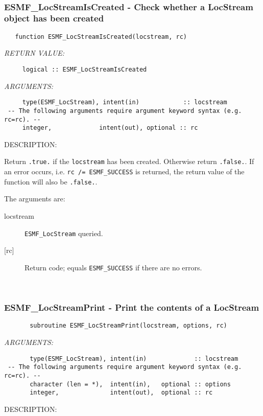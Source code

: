  
\mbox{}\hrulefill\ 
 
\subsubsection [ESMF\_LocStreamIsCreated] {ESMF\_LocStreamIsCreated - Check whether a LocStream object has been created}


  
\begin{verbatim}   function ESMF_LocStreamIsCreated(locstream, rc)\end{verbatim}{\em RETURN VALUE:}
\begin{verbatim}     logical :: ESMF_LocStreamIsCreated\end{verbatim}{\em ARGUMENTS:}
\begin{verbatim}     type(ESMF_LocStream), intent(in)            :: locstream
 -- The following arguments require argument keyword syntax (e.g. rc=rc). --
     integer,             intent(out), optional :: rc
 \end{verbatim}
{\sf DESCRIPTION:\\ }


     Return {\tt .true.} if the {\tt locstream} has been created. Otherwise return 
     {\tt .false.}. If an error occurs, i.e. {\tt rc /= ESMF\_SUCCESS} is 
     returned, the return value of the function will also be {\tt .false.}.
  
   The arguments are:
     \begin{description}
     \item[locstream]
       {\tt ESMF\_LocStream} queried.
     \item[{[rc]}]
       Return code; equals {\tt ESMF\_SUCCESS} if there are no errors.
     \end{description}
   
 
\mbox{}\hrulefill\ 
 
\subsubsection [ESMF\_LocStreamPrint] {ESMF\_LocStreamPrint - Print the contents of a LocStream}


 
\begin{verbatim}       subroutine ESMF_LocStreamPrint(locstream, options, rc)\end{verbatim}{\em ARGUMENTS:}
\begin{verbatim}       type(ESMF_LocStream), intent(in)             :: locstream 
 -- The following arguments require argument keyword syntax (e.g. rc=rc). --
       character (len = *),  intent(in),   optional :: options
       integer,              intent(out),  optional :: rc\end{verbatim}
{\sf DESCRIPTION:\\ }


